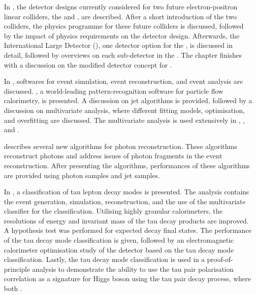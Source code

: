 

In , the detector designs currently considered for two future electron-positron linear colliders, the \ILC and \CLIC, are described. After a short introduction of the two colliders, the physics programme for these future colliders is discussed, followed by the impact of physics requirements on the detector design. Afterwards, the International Large Detector (\ILD), one detector option for the \ILC, is discussed in detail, followed by overviews on each sub-detector in the \ILD. The chapter finishes with a discussion on the modified \ILD detector concept for \CLIC.

In , softwares for event simulation, event reconstruction, and event analysis are  discussed.  \pandora, a world-leading pattern-recognition software for particle flow calorimetry, is presented. A discussion on jet algorithms is provided, followed by a discussion on  multivariate analysis, where different fitting models, optimisation, and overfitting are discussed. The multivariate analysis is used extensively in , , and .



 describes several new \pandora algorithms for photon reconstruction. These algorithms reconstruct photons and address issues of photon fragments in the event reconstruction. After presenting the algorithms, performances of these algorithms are provided using photon samples and jet samples.

In , a classification of tau lepton decay modes is presented. The analysis contains the event generation, simulation, reconstruction, and the use of the multivariate classifier for the classification. Utilising highly granular calorimeters, the resolutions of energy and invariant mass of the tau decay products are improved. A hypothesis test was performed for expected decay final states.  The performance of the tau decay mode classification is given, followed by an electromagnetic calorimeter optimisation study of the \ILD detector based on the tau decay mode classification. Lastly, the  tau decay mode classification is used in a proof-of-principle analysis to demonstrate the ability to use the tau pair polarisation correlation as a signature for Higgs boson using the tau pair decay process, where both \tauToPionBoth.

